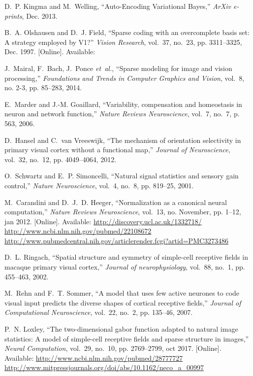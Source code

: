 \documentclass[letterpaper,final,conference,10pt]{IEEEtran}
\begin{document}
\begin{thebibliography}{10}
D.~P. {Kingma} and M.~{Welling}, ``{Auto-Encoding Variational Bayes},''
  \emph{ArXiv e-prints}, Dec. 2013.

\BIBentryALTinterwordspacing
B.~A. Olshausen and D.~J. Field, ``Sparse coding with an overcomplete basis
  set: A strategy employed by {V1}?'' \emph{Vision Research}, vol.~37, no.~23,
  pp. 3311--3325, Dec. 1997. [Online]. Available:
\BIBentrySTDinterwordspacing

J.~Mairal, F.~Bach, J.~Ponce \emph{et~al.}, ``Sparse modeling for image and
  vision processing,'' \emph{Foundations and Trends in Computer Graphics and
  Vision}, vol.~8, no. 2-3, pp. 85--283, 2014.

E.~Marder and J.-M. Goaillard, ``Variability, compensation and homeostasis in
  neuron and network function,'' \emph{Nature Reviews Neuroscience}, vol.~7,
  no.~7, p. 563, 2006.

D.~Hansel and C.~van Vreeswijk, ``The mechanism of orientation selectivity in
  primary visual cortex without a functional map,'' \emph{Journal of
  Neuroscience}, vol.~32, no.~12, pp. 4049--4064, 2012.

O.~Schwartz and E.~P. Simoncelli, ``Natural signal statistics and sensory gain
  control,'' \emph{Nature Neuroscience}, vol.~4, no.~8, pp. 819--25, 2001.

\BIBentryALTinterwordspacing
M.~Carandini and D.~J.~D. Heeger, ``Normalization as a canonical neural
  computation,'' \emph{Nature Reviews Neuroscience}, vol.~13, no. November, pp.
  1--12, jan 2012. [Online]. Available:
  \url{http://discovery.ucl.ac.uk/1332718/
  http://www.ncbi.nlm.nih.gov/pubmed/22108672
  http://www.pubmedcentral.nih.gov/articlerender.fcgi?artid=PMC3273486}
\BIBentrySTDinterwordspacing

D.~L. Ringach, ``Spatial structure and symmetry of simple-cell receptive fields
  in macaque primary visual cortex,'' \emph{Journal of neurophysiology},
  vol.~88, no.~1, pp. 455--463, 2002.

M.~Rehn and F.~T. Sommer, ``A model that uses few active neurones to code
  visual input predicts the diverse shapes of cortical receptive fields,''
  \emph{Journal of {C}omputational {N}euroscience}, vol.~22, no.~2, pp.
  135--46, 2007.

\BIBentryALTinterwordspacing
P.~N. Loxley, ``The two-dimensional gabor function adapted to natural image
  statistics: A model of simple-cell receptive fields and sparse structure in
  images,'' \emph{Neural Computation}, vol.~29, no.~10, pp. 2769--2799, oct
  2017. [Online]. Available: \url{http://www.ncbi.nlm.nih.gov/pubmed/28777727
  http://www.mitpressjournals.org/doi/abs/10.1162/neco_a_00997}
\BIBentrySTDinterwordspacing


\end{thebibliography}
\end{document}
